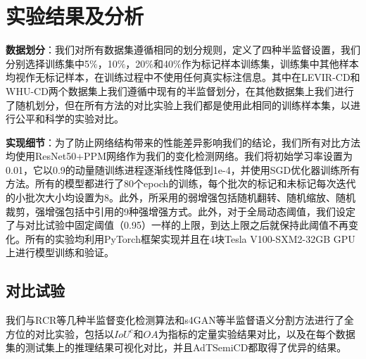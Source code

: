 \documentclass[lang=chs, degree=master, blindreview=false, adobe=false]{yanputhesis}
\begin{document}
\section{实验结果及分析}
\textbf{数据划分}：我们对所有数据集遵循相同的划分规则，定义了四种半监督设置，我们分别选择训练集中5$\%$，10$\%$，20$\%$和40$\%$作为标记样本训练集，训练集中其他样本均视作无标记样本，在训练过程中不使用任何真实标注信息。其中在LEVIR-CD和WHU-CD两个数据集上我们遵循\cite{bandara2022RCR}\cite{Zhang2023FPA}中现有的半监督划分，在其他数据集上我们进行了随机划分，但在所有方法的对比实验上我们都是使用此相同的训练样本集，以进行公平和科学的实验对比。

\textbf{实现细节}：为了防止网络结构带来的性能差异影响我们的结论，我们所有对比方法均使用ResNet50+PPM网络作为我们的变化检测网络。我们将初始学习率设置为0.01，它以0.9的动量随训练进程逐渐线性降低到1e-4，并使用SGD优化器训练所有方法。所有的模型都进行了80个epoch的训练，每个批次的标记和未标记每次迭代的小批次大小均设置为8。此外，所采用的弱增强包括随机翻转、随机缩放、随机裁剪，强增强包括\cite{cubuk2020randaugment}中引用的9种强增强方式。此外，对于全局动态阈值，我们设定了与对比试验中固定阈值（0.95）一样的上限，到达上限之后就保持此阈值不再变化。所有的实验均利用PyTorch框架实现并且在4块Tesla V100-SXM2-32GB GPU上进行模型训练和验证。
\subsection{对比试验}
我们与RCR等几种半监督变化检测算法和s4GAN等半监督语义分割方法进行了全方位的对比实验，包括以$IoU^c$和$OA$为指标的定量实验结果对比，以及在每个数据集的测试集上的推理结果可视化对比，并且AdTSemiCD都取得了优异的结果。
\end{document}
